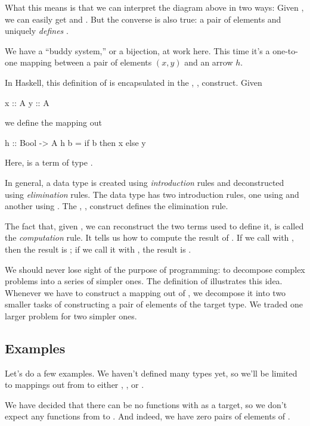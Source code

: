 \documentclass[DaoFP]{subfiles}
\begin{document}
What this means is that we can interpret the diagram above in two ways: Given , we can easily get  and . But the converse is also true: a pair of elements  and  uniquely \emph{defines} .

We have a ``buddy system,'' or a bijection, at work here. This time it's a one-to-one mapping between a pair of elements $(x, y)$ and an arrow $h$. 

In Haskell, this definition of  is encapsulated in the , ,  construct. Given
\begin{haskell}
x :: A
y :: A
\end{haskell}
we define the mapping out
\begin{haskell}
h :: Bool -> A
h b = if b then x else y
\end{haskell}
Here,  is a term of type . 

In general, a data type is created using \emph{introduction} rules and deconstructed using \emph{elimination} rules. The  data type has two introduction rules, one using  and another using . The , ,  construct defines the elimination rule. 

The fact that, given , we can reconstruct the two terms used to define it, is called the \emph{computation} rule. It tells us how to compute the result of . If we call  with , then the result is ; if we call it with , the result is .

We should never lose sight of the purpose of programming: to decompose complex problems into a series of simpler ones. The definition of  illustrates this idea. Whenever we have to construct a mapping out of , we decompose it into two smaller tasks of constructing a pair of elements of the target type. We traded one larger problem for two simpler ones.

\subsection{Examples}

Let's do a few examples. We haven't defined many types yet, so we'll be limited to mappings out from  to either , \hask{()}, or . 

We have decided that there can be no functions with  as a target, so we don't expect any functions from  to . And indeed, we have zero pairs of elements of . 
\end{document}
